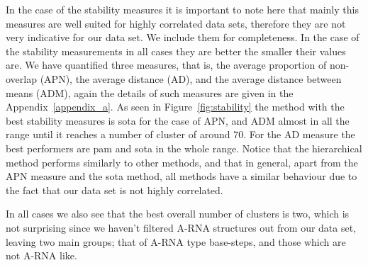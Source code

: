 In the  case of the  stability measures it  is important to  note here
that mainly this  measures are well suited for  highly correlated data
sets,  therefore they are  not very  indicative for  our data  set. We
include  them  for  completeness.    In  the  case  of  the  stability
measurements in  all cases  they are better  the smaller  their values
are.   We  have  quantified  three  measures,  that  is,  the  average
proportion of  non-overlap (APN), the  average distance (AD),  and the
average  distance  between means  (ADM),  again  the  details of  such
measures are given in the Appendix~\ref{appendix_a}.  As seen in
Figure~\ref{fig:stability} the method with the best stability measures
is sota for the case of APN,  and ADM almost in all the range until it
reaches a number of cluster of  around 70. For the AD measure the best
performers  are pam  and sota  in the  whole range.   Notice  that the
hierarchical method  performs similarly to other methods,  and that in
general, apart from  the APN measure and the  sota method, all methods
have a  similar behaviour  due to the  fact that  our data set  is not
highly correlated.

In all cases  we also see that the best overall  number of clusters is
two,  which  is  not   surprising  since  we  haven't  filtered  A-RNA
structures out  from our  data set, leaving  two main groups;  that of
A-RNA type base-steps, and those which are not A-RNA like.

